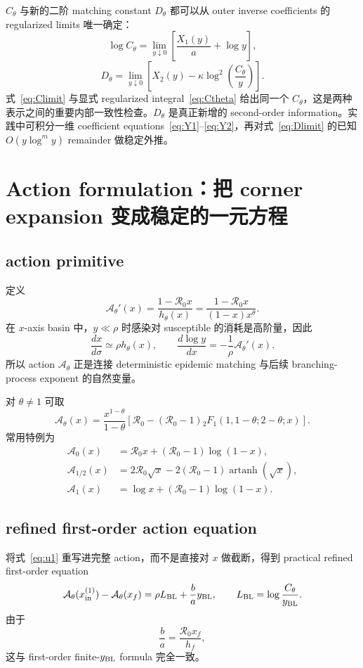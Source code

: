 \documentclass[11pt,a4paper]{ctexart}
\newcommand{\Rzero}{\mathcal R_0}
\newcommand{\Afun}{\mathcal A_\theta}
\newcommand{\BL}{y_{\rm BL}}
\newcommand{\xf}{x_f}
\begin{document}
$C_\theta$ 与新的二阶 matching constant $D_\theta$ 都可以从 outer inverse coefficients 的 regularized limits 唯一确定：
\begin{equation}
\label{eq:Climit}
\log C_\theta
=\lim_{y\downarrow0}
\left[\frac{X_1(y)}a+\log y\right],
\end{equation}
\begin{equation}
\label{eq:Dlimit}
D_\theta
=\lim_{y\downarrow0}
\left[
X_2(y)-\kappa\log^2\!\left(\frac{C_\theta}{y}\right)
\right].
\end{equation}
式~\eqref{eq:Climit} 与显式 regularized integral~\eqref{eq:Ctheta} 给出同一个 $C_\theta$，这是两种表示之间的重要内部一致性检查。$D_\theta$ 是真正新增的 second-order information。实践中可积分一维 coefficient equations~\eqref{eq:Y1}--\eqref{eq:Y2}，再对式~\eqref{eq:Dlimit} 的已知 $O(y\log^m y)$ remainder 做稳定外推。

\section{Action formulation：把 corner expansion 变成稳定的一元方程}
\subsection{action primitive}
定义
\begin{equation}
\label{eq:Adef}
\Afun'(x)
=\frac{1-\Rzero x}{h_\theta(x)}
=\frac{1-\Rzero x}{(1-x)x^\theta}.
\end{equation}
在 $x$-axis basin 中，$y\ll\rho$ 时感染对 susceptible 的消耗是高阶量，因此
\[
\frac{dx}{d\sigma}\simeq\rho h_\theta(x),
\qquad
\frac{d\log y}{dx}
=-\frac1\rho\Afun'(x).
\]
所以 action $\Afun$ 正是连接 deterministic epidemic matching 与后续 branching-process exponent 的自然变量。

对 $\theta\neq1$ 可取
\begin{equation}
\label{eq:Ahyper}
\Afun(x)
=\frac{x^{1-\theta}}{1-\theta}
\left[
\Rzero-(\Rzero-1)
{}_2F_1(1,1-\theta;2-\theta;x)
\right].
\end{equation}
常用特例为
\begin{align}
\mathcal A_0(x)
&=\Rzero x+(\Rzero-1)\log(1-x),\\
\mathcal A_{1/2}(x)
&=2\Rzero\sqrt{x}-2(\Rzero-1)\operatorname{artanh}(\sqrt{x}),\\
\mathcal A_1(x)
&=\log x+(\Rzero-1)\log(1-x).
\end{align}

\subsection{refined first-order action equation}
将式~\eqref{eq:u1} 重写进完整 action，而不是直接对 $x$ 做截断，得到 practical refined first-order equation
\begin{equation}
\label{eq:M1}
\Afun(x_{\rm in}^{(1)})-\Afun(\xf)
=\rho L_{\rm BL}+\frac ba\BL,
\qquad
L_{\rm BL}=\log\frac{C_\theta}{\BL}.
\end{equation}
由于
\[
\frac ba=\frac{\Rzero\xf}{h_f},
\]
这与 first-order finite-$\BL$ formula 完全一致。
\end{document}
